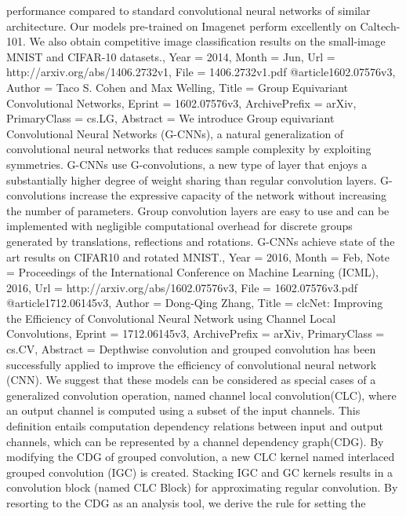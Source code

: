 {{{{{performance compared to standard convolutional neural networks of similar
architecture. Our models pre-trained on Imagenet perform excellently on
Caltech-101. We also obtain competitive image classification results on the
small-image MNIST and CIFAR-10 datasets.},
Year          = {2014},
Month         = {Jun},
Url           = {http://arxiv.org/abs/1406.2732v1},
File          = {1406.2732v1.pdf}
}
@article{1602.07576v3,
Author        = {Taco S. Cohen and Max Welling},
Title         = {Group Equivariant Convolutional Networks},
Eprint        = {1602.07576v3},
ArchivePrefix = {arXiv},
PrimaryClass  = {cs.LG},
Abstract      = {We introduce Group equivariant Convolutional Neural Networks (G-CNNs), a
natural generalization of convolutional neural networks that reduces sample
complexity by exploiting symmetries. G-CNNs use G-convolutions, a new type of
layer that enjoys a substantially higher degree of weight sharing than regular
convolution layers. G-convolutions increase the expressive capacity of the
network without increasing the number of parameters. Group convolution layers
are easy to use and can be implemented with negligible computational overhead
for discrete groups generated by translations, reflections and rotations.
G-CNNs achieve state of the art results on CIFAR10 and rotated MNIST.},
Year          = {2016},
Month         = {Feb},
Note          = {Proceedings of the International Conference on Machine Learning
  (ICML), 2016},
Url           = {http://arxiv.org/abs/1602.07576v3},
File          = {1602.07576v3.pdf}
}
@article{1712.06145v3,
Author        = {Dong-Qing Zhang},
Title         = {clcNet: Improving the Efficiency of Convolutional Neural Network using
  Channel Local Convolutions},
Eprint        = {1712.06145v3},
ArchivePrefix = {arXiv},
PrimaryClass  = {cs.CV},
Abstract      = {Depthwise convolution and grouped convolution has been successfully applied
to improve the efficiency of convolutional neural network (CNN). We suggest
that these models can be considered as special cases of a generalized
convolution operation, named channel local convolution(CLC), where an output
channel is computed using a subset of the input channels. This definition
entails computation dependency relations between input and output channels,
which can be represented by a channel dependency graph(CDG). By modifying the
CDG of grouped convolution, a new CLC kernel named interlaced grouped
convolution (IGC) is created. Stacking IGC and GC kernels results in a
convolution block (named CLC Block) for approximating regular convolution. By
resorting to the CDG as an analysis tool, we derive the rule for setting the
}}}}}
